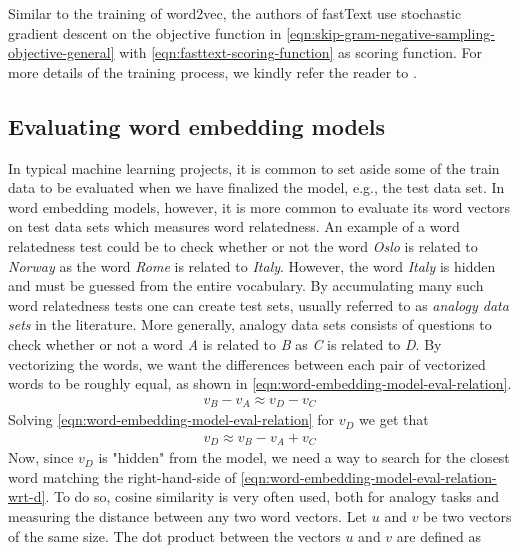 Similar to the training of word2vec, the authors of fastText use stochastic gradient descent on the objective function in \cref{eqn:skip-gram-negative-sampling-objective-general} with \cref{eqn:fasttext-scoring-function} as scoring function. For more details of the training process, we kindly refer the reader to \cite[p. 3-4]{bojanowski2017enriching}.

\subsection{Evaluating word embedding models}
\label{sec:eval-word2vec-model}
In typical machine learning projects, it is common to set aside some of the train data to be evaluated when we have finalized the model, e.g., the test data set. In word embedding models, however, it is more common to evaluate its word vectors on test data sets which measures word relatedness. An example of a word relatedness test could be to check whether or not the word \textit{Oslo} is related to \textit{Norway} as the word \textit{Rome} is related to \textit{Italy}. However, the word \textit{Italy} is hidden and must be guessed from the entire vocabulary. By accumulating many such word relatedness tests one can create test sets, usually referred to as \textit{analogy data sets} in the literature. More generally, analogy data sets consists of questions to check whether or not a word \textit{A} is related to \textit{B} as \textit{C} is related to \textit{D}. By vectorizing the words, we want the differences between each pair of vectorized words to be roughly equal, as shown in \cref{eqn:word-embedding-model-eval-relation}.
\begin{align}
    v_{\textit{B}} - v_{\textit{A}} \approx v_{\textit{D}} - v_{\textit{C}}
    \label{eqn:word-embedding-model-eval-relation}
\end{align}
Solving \cref{eqn:word-embedding-model-eval-relation} for $v_{\textit{D}}$ we get that
\begin{align}
    v_{\textit{D}} \approx v_{\textit{B}} - v_{\textit{A}} + v_{\textit{C}}
    \label{eqn:word-embedding-model-eval-relation-wrt-d}
\end{align}
Now, since $v_{\textit{D}}$ is "hidden" from the model, we need a way to search for the closest word matching the right-hand-side of \cref{eqn:word-embedding-model-eval-relation-wrt-d}. To do so, cosine similarity is very often used, both for analogy tasks and measuring the distance between any two word vectors. Let $u$ and $v$ be two vectors of the same size. The dot product between the vectors $u$ and $v$ are defined as
